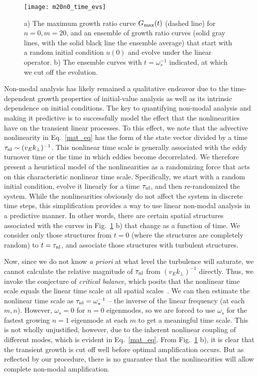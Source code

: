 \documentclass[letter,scriptaddress,twocolumn, prl,showkeys]{revtex4}
\begin{document}
\begin{figure}
\centerline{\texttt{[image: m20n0\_time\_evs]}}
\caption{a) The maximum growth ratio curve $G_{\rm{max}}(t)$ (dashed line) for $n=0,m=20$, and an ensemble of growth ratio curves (solid gray lines, with the solid black line the ensemble average)
that start with a random initial condition $u(0)$ and evolve under the linear operator. b) The ensemble curves with $t=\omega_s^{-1}$ indicated, at which we cut off the evolution.}
\label{m20n0_time_evs}
\end{figure}

Non-modal analysis has likely remained a qualitative endeavor due to the time-dependent growth properties of initial-value analysis as well as its intrinsic dependence on initial conditions.
The key to quantifying non-modal analysis and making it predictive is to successfully model the effect that the nonlinearities have on the transient linear processes. 
To this effect, we note that the advective nonlinearity in Eq.~\ref{mat_eq} has the form of the state vector divided by a time $\tau_{\rm{nl}} \sim (v_E k_\perp)^{-1}$. This nonlinear
time scale is generally associated with the eddy turnover time or the time in which eddies become decorrelated. We therefore present a heuristical model of the nonlinearities 
as a randomizing force that acts on this characteristic nonlinear time scale.
Specifically, we start with a random initial condition, evolve it linearly for a time $\tau_{\rm{nl}}$, and then re-randomized the system.
While the nonlinearities obviously do not affect the system in discrete time steps, this simplification provides a way to use linear non-modal analysis in a predictive manner.
In other words, there are certain spatial structures associated with the curves in Fig.~\ref{m20n0_time_evs} b) that change as a function of time. We consider only those structures from $t=0$ (where
the structures are completely random) to $t = \tau_{\rm{nl}}$, and associate those structures with turbulent structures.

Now, since we do not know \emph{a priori} at what level the turbulence will saturate, we cannot calculate the relative magnitude of $\tau_{\rm{nl}}$ from $(v_E k_\perp)^{-1}$ directly.
Thus, we invoke the conjecture of \emph{critical balance}, which posits that the nonlinear time scale equals the linear time scale at all spatial scales~\cite{schekochihin2012}. 
We can then estimate the nonlinear time scale as $\tau_{\rm{nl}} = \omega_s^{-1}$ -- the inverse of the linear frequency (at each $m,n$).
However, $\omega_s = 0$ for $n=0$ eigenmodes, so we are forced to use $\omega_s$ for the fastest growing $n=1$ eigenmode at each $m$ to get a meaningful time scale. This is not wholly
unjustified, however, due to the inherent nonlinear coupling of different modes, which is evident in Eq.~\ref{mat_eq}.
From Fig.~\ref{m20n0_time_evs} b), it is clear that the transient growth is cut off well before optimal amplification occurs. 
But as reflected by our procedure, there is no guarantee that the nonlinearities will allow complete non-modal amplification.
\end{document}
